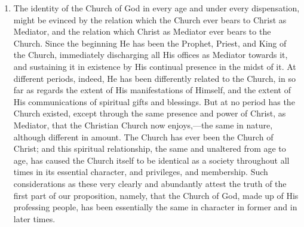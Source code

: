 \documentclass[]{book}
\begin{document}
\begin{enumerate}
\item
  The identity of the Church of God in every age and under every dispensation, might be evinced by the relation which the Church ever bears to Christ as Mediator, and the relation which Christ as Mediator ever bears to the Church. Since the beginning He has been the Prophet, Priest, and King of the Church, immediately discharging all His offices as Mediator towards it, and sustaining it in existence by His continual presence in the midst of it. At different periods, indeed, He has been differently related to the Church, in so far as regards the extent of His manifestations of Himself, and the extent of His communications of spiritual gifts and blessings. But at no period has the Church existed, except through the same presence and power of Christ, as Mediator, that the Christian Church now enjoys,---the same in nature, although different in amount. The Church has ever been the Church of Christ; and this spiritual relationship, the same and unaltered from age to age, has caused the Church itself to be identical as a society throughout all times in its essential character, and privileges, and membership. Such considerations as these very clearly and abundantly attest the truth of the first part of our proposition, namely, that the Church of God, made up of His professing people, has been essentially the same in character in former and in later times.
\end{enumerate}
\end{document}
